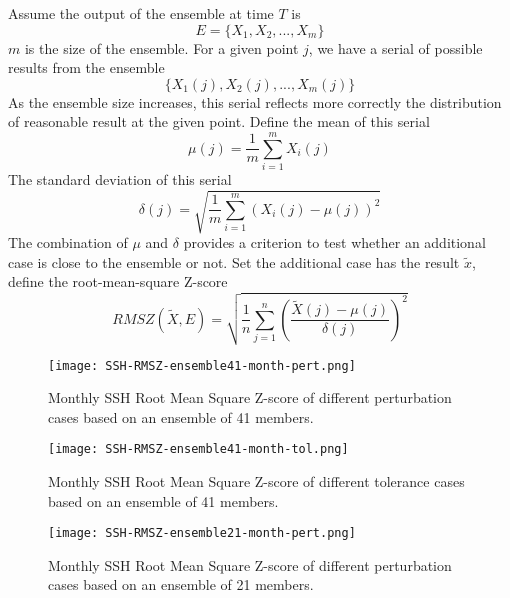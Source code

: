 \documentclass{sig-alternate}
\begin{document}
Assume the output of the ensemble at time $T$ is $$E=\{X_1,X_2,...,X_m\}$$ 
$m$ is the size of the ensemble. 
For a given point $j$, we have a serial of possible results from the ensemble $$\{X_1(j),X_2(j),...,X_m(j)\}$$
As the ensemble size increases, this serial reflects more correctly the distribution of reasonable result at the given point. 
Define the mean of this serial $$ \mu (j) = \frac{1}{m}\sum_{i=1}^m X_i(j) $$
The standard deviation of this serial  $$ \delta (j) = \sqrt{\frac{1}{m} \sum_{i=1}^m (X_i(j)-\mu(j))^2 }$$
The combination of $\mu$ and $\delta$ provides a criterion to test whether an additional case is close to the ensemble or not. 
Set the additional case has the result $\tilde{x}$, define the root-mean-square Z-score 
$$ RMSZ(\tilde{X}, E) =  \sqrt{\frac{1}{n}\sum_{j=1}^n(\frac{\tilde{X}(j) -\mu (j)}{\delta (j)})^2}$$
\begin{figure}
\begin{center}
\texttt{[image: SSH-RMSZ-ensemble41-month-pert.png]}
\end{center}
\caption[] {Monthly SSH Root Mean Square Z-score of different perturbation cases based on an ensemble of 41 members.}
\label{fig:ssh_rmsz_p}
\end{figure}

\begin{figure}
\begin{center}
\texttt{[image: SSH-RMSZ-ensemble41-month-tol.png]}
\end{center}
\caption[] {Monthly SSH Root Mean Square Z-score of different tolerance cases based on an ensemble of 41 members.}
\label{fig:ssh_rmsz_t}
\end{figure}
\begin{figure}
\begin{center}
\texttt{[image: SSH-RMSZ-ensemble21-month-pert.png]}
\end{center}
\caption[] {Monthly SSH Root Mean Square Z-score of different perturbation cases based on an ensemble of 21 members.}
\label{fig:ssh_rmsz_p21}
\end{figure}
\end{document}
